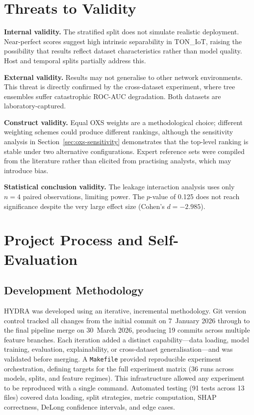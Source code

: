 \documentclass[12pt,a4paper]{report}
\begin{document}
\section{Threats to Validity}
\label{sec:threats}

\textbf{Internal validity.} The stratified split does not simulate realistic deployment. Near-perfect scores suggest high intrinsic separability in TON\_IoT, raising the possibility that results reflect dataset characteristics rather than model quality. Host and temporal splits partially address this.

\textbf{External validity.} Results may not generalise to other network environments. This threat is directly confirmed by the cross-dataset experiment, where tree ensembles suffer catastrophic ROC-AUC degradation. Both datasets are laboratory-captured.

\textbf{Construct validity.} Equal OXS weights are a methodological choice; different weighting schemes could produce different rankings, although the sensitivity analysis in Section~\ref{sec:oxs-sensitivity} demonstrates that the top-level ranking is stable under two alternative configurations. Expert reference sets were compiled from the literature rather than elicited from practising analysts, which may introduce bias.

\textbf{Statistical conclusion validity.} The leakage interaction analysis uses only $n = 4$ paired observations, limiting power. The $p$-value of 0.125 does not reach significance despite the very large effect size (Cohen's $d = -2.985$).

\section{Project Process and Self-Evaluation}
\label{sec:self-evaluation}

\subsection*{Development Methodology}

HYDRA was developed using an iterative, incremental methodology. Git version control tracked all changes from the initial commit on 7~January 2026 through to the final pipeline merge on 30~March 2026, producing 19 commits across multiple feature branches. Each iteration added a distinct capability---data loading, model training, evaluation, explainability, or cross-dataset generalisation---and was validated before merging. A \texttt{Makefile} provided reproducible experiment orchestration, defining targets for the full experiment matrix (36 runs across models, splits, and feature regimes). This infrastructure allowed any experiment to be reproduced with a single command. Automated testing (91 tests across 13 files) covered data loading, split strategies, metric computation, SHAP correctness, DeLong confidence intervals, and edge cases.
\end{document}

